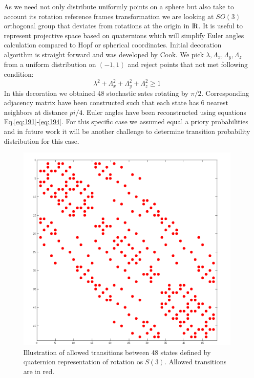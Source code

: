 As we need not only distribute uniformly points on a sphere but also take to account its rotation reference frames transformation we are looking at $SO(3)$ orthogonal group that deviates from rotations at the origin in ${\rm I\!R}$. It is useful to represent projective space based on quaternions which will simplify Euler angles calculation compared to Hopf or spherical coordinates. Initial decoration algorithm is straight forward and was developed by Cook\cite{cook}. We pick $\lambda, \Lambda_x, \Lambda_y,\Lambda_z$ from a uniform distribution on $(-1,1)$ and reject points that not met following condition: 
\begin{equation}\label{eq:cook}
\lambda^2+\Lambda_x^2+\Lambda_y^2+\Lambda_z^2\geq1
\end{equation}
In this decoration we obtained 48 stochastic sates rotating by $\pi/2$. Corresponding adjacency matrix have been constructed such that each state has 6 nearest neighbors at distance $pi/4$. Euler angles have been reconstructed using equations Eq.\ref{eq:191}-\ref{eq:194}. For this specific case we assumed equal a priory probabilities and in future work it will be another challenge to determine transition probability distribution for this case. 
\begin{figure}[h!]
\begin{center}
\includegraphics[scale=0.5]{figures/chap2/sparce.png}
\caption{Illustration of allowed transitions between 48 states defined by quaternion representation of  rotation os $S(3)$. Allowed transitions are in red. }
\label{figure:blumediag}
\end{center}
\end{figure}  
\clearpage
